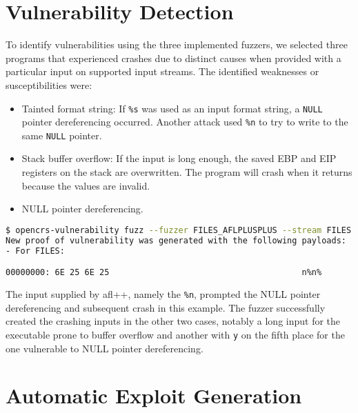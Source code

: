 \documentclass[../main.tex]{subfiles}
\begin{document}
\hypertarget{vulnerability-detection}{%
  \section{Vulnerability Detection}\label{vulnerability-detection}}

To identify vulnerabilities using the three implemented fuzzers, we selected
three programs that experienced crashes due to distinct causes when provided
with a particular input on supported input streams. The identified weaknesses
or susceptibilities were:

\begin{itemize}
  \tightlist
  \item
        Tainted format string: If \texttt{\%s} was used as an input format
        string, a \texttt{NULL} pointer dereferencing occurred. Another attack
        used \texttt{\%n} to try to write to the same \texttt{NULL} pointer.
  \item
        Stack buffer overflow: If the input is long enough, the saved EBP and
        EIP registers on the stack are overwritten. The program will crash
        when it returns because the values are invalid.
  \item
        NULL pointer dereferencing.
\end{itemize}

\begin{lstlisting}[captionpos=b,basicstyle=\tiny,language=Bash, caption=Example of Generating a Proof of Vulnerability while Fuzzing]
$ opencrs-vulnerability fuzz --fuzzer FILES_AFLPLUSPLUS --stream FILES --elf tainted_format_string_files.elf
New proof of vulnerability was generated with the following payloads:
- For FILES:

00000000: 6E 25 6E 25                                       n%n%
\end{lstlisting}

The input supplied by afl++, namely the \texttt{\%n}, prompted the NULL pointer
dereferencing and subsequent crash in this example. The fuzzer successfully
created the crashing inputs in the other two cases, notably a long input for
the executable prone to buffer overflow and another with \texttt{y} on the
fifth place for the one vulnerable to NULL pointer dereferencing.

\hypertarget{automatic-exploit-generation}{%
  \section{Automatic Exploit
    Generation}\label{automatic-exploit-generation}}
\end{document}
